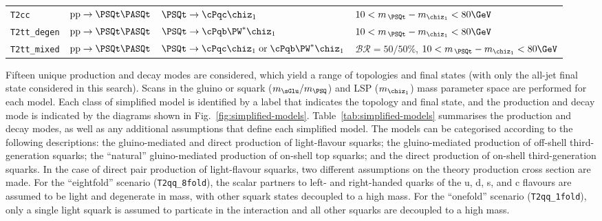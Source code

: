 \begin{table}[tb]
\begin{tabular}{ llll }
\texttt{T2cc}          %
                       & $\text{pp}\ra\PSQt\PASQt$      
                       & $\PSQt\ra\cPqc\chiz_1$
                       & $10 < m_{\,\PSQt} - m_{\chiz_1} < 80\GeV$                                      \\ [0.5ex]
\texttt{T2tt\_degen}   %
                       & $\text{pp}\ra\PSQt\PASQt$      
                       & $\PSQt\ra\cPqb\PW^*\chiz_1$
                       & $10 < m_{\,\PSQt} - m_{\chiz_1} < 80\GeV$                                      \\ [0.5ex]
\texttt{T2tt\_mixed}   %
                       & $\text{pp}\ra\PSQt\PASQt$      
                       & $\PSQt\ra\cPqc\chiz_1 \;\text{or}\; \cPqb\PW^*\chiz_1$
                       & $\mathcal{BR} = 50/50\%$, $10 < m_{\,\PSQt} - m_{\chiz_1} < 80\GeV$            \\ [0.5ex]
    \hline
  \end{tabular}
\end{table}

Fifteen unique production and decay modes are considered, which yield
a range of topologies and final states (with only the all-jet final
state considered in this search). Scans in the gluino or squark
($m_{\sGlu} / m_{\PSQ}$) and LSP ($m_{\chiz_1}$) mass parameter space
are performed for each model. Each class of simplified model is
identified by a label that indicates the topology and final state, and
the production and decay mode is indicated by the diagrams shown in
Fig.~\ref{fig:simplified-models}. Table~\ref{tab:simplified-models}
summarises the production and decay modes, as well as any additional
assumptions that define each simplified model. The models can be
categorised according to the following descriptions: the
gluino-mediated and direct production of light-flavour squarks; the
gluino-mediated production of off-shell third-generation squarks; the
``natural'' gluino-mediated production of on-shell top squarks; and
the direct production of on-shell third-generation squarks. In the
case of direct pair production of light-flavour squarks, two different
assumptions on the theory production cross section are made. For the
``eightfold'' scenario (\texttt{T2qq\_8fold}), the scalar partners to
left- and right-handed quarks of the u, d, s, and c flavours are
assumed to be light and degenerate in mass, with other squark states
decoupled to a high mass. For the ``onefold'' scenario
(\texttt{T2qq\_1fold}), only a single light squark is assumed to
particate in the interaction and all other squarks are decoupled to a
high mass. 

